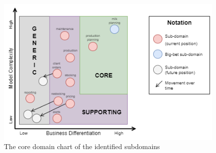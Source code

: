 \begin{figure}[H]
    \centering
    \includegraphics[width=\textwidth]{img/core-domain-chart.png}
    \caption{The core domain chart of the identified subdomains}
    \label{img:core-domain-chart}
\end{figure}
